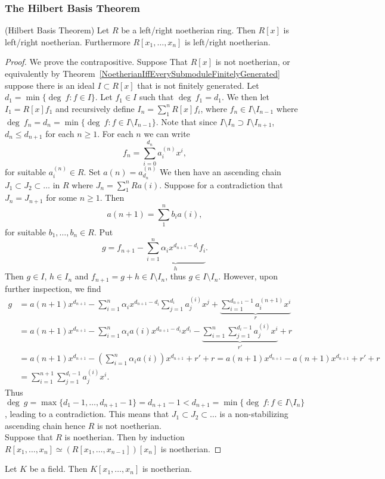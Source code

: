 \subsubsection{The Hilbert Basis Theorem}
\begin{theorem}(Hilbert Basis Theorem)\label{EveryPolynomialIdealIsFinitelyGenerated}
    Let $R$ be a left/right noetherian ring. Then $R[x]$ is left/right noetherian. Furthermore $R[x_1,\dots,x_n]$ is left/right noetherian. 
\end{theorem}
\begin{proof}
    We prove the contrapositive. Suppose That $R[x]$ is not noetherian, or equivalently by Theorem~\ref{NoetherianIffEverySubmoduleFinitelyGenerated} suppose there is an ideal $I\subset R[x]$ that is not finitely generated. Let $d_1 = \min\{\deg \ f : f \in I\}$. Let $f_1 \in I$ such that $\deg \ f_1 = d_1$. We then let $I_1 = R[x]f_1$ and recursively define $I_n = \sum_1^n R[x]f_i$, where $f_n \in I\setminus I_{n-1}$ where $\deg \ f_n = d_n = \min\{ \deg \ f: f \in I \setminus I_{n-1}\}$. Note that since $I\setminus I_n \supset I\setminus I_{n+1}$, $d_n\leq d_{n+1}$ for each $n\geq 1$. For each $n$ we can write 
    $$f_n = \sum_{i=0}^{d_n} a_i^{(n)}x^i,$$
    for suitable $a_i^{(n)}\in R$. Set $a(n) = a_{d_n}^{(n)}$
    We then have an ascending chain $J_1\subset J_2\subset\dots$ in $R$ where $J_n =\sum_1^n Ra(i)$.
    Suppose for a contradiction that $J_n = J_{n+1}$ for some $n\geq 1$. Then 
    $$a(n+1) = \sum_1^n b_ia(i),$$
    for suitable $b_1,\dots,b_n \in R.$ Put 
    $$g = f_{n+1} - \underbrace{\sum_{i=1}^n\alpha_i x^{d_{n+1}-d_i}f_i}_{h}.$$
    Then $g \in I$, $h\in I_n$ and $f_{n+1} = g + h\in I\setminus I_n$, thus $g \in I \setminus I_n$. However, upon further inspection, we find
    \begin{align*}
        g &= a(n+1)x^{d_{n+1}} -\sum_{i=1}^n\alpha_ix^{d_{n+1}-d_i}\sum_{j=1}^{d_i} a_j^{(i)} x^j + \underbrace{\sum_{i=1}^{d_{n+1}-1} a_i^{(n+1)}x^i}_{r}\\ 
        &= a(n+1)x^{d_{n+1}}-\sum_{i=1}^n\alpha_ia(i) x^{d_{n+1}-d_i}x^{d_i}-\underbrace{\sum_{i=1}^n\sum_{j=1}^{d_i-1} a_j^{(i)}x^i}_{r'} + r \\
        &= a(n+1)x^{d_{n+1}}-\left(\sum_{i=1}^n\alpha_ia(i) \right)x^{d_{n+1}}+r'+r =a(n+1)x^{d_{n+1}}-a(n+1)x^{d_{n+1}} +r'+r\\ &= \sum_{i=1}^{n+1}\sum_{j=1}^{d_i-1}a_j^{(i)}x^{i}.
    \end{align*}
    Thus $\deg \ g = \max\{d_1-1,\dots,d_{n+1}-1\} = d_{n+1}-1< d_{n+1} =\min\{ \deg \ f : f \in I\setminus I_n\}$, leading to a contradiction. This means that $J_1\subset J_2\subset \dots$ is a non-stabilizing ascending chain hence $R$ is not noetherian.\\
    Suppose that $R$ is noetherian. Then by induction $R[x_1,\dots,x_n]\simeq \left(R[x_1,\dots,x_{n-1}]\right)[x_n]$ is noetherian.
\end{proof}
\begin{corollary}\label{PolynomialIdealOverFieldIsFinitelyGenerated}
    Let $K$ be a field. Then $K[x_1,\dots,x_n]$ is noetherian.
\end{corollary}
